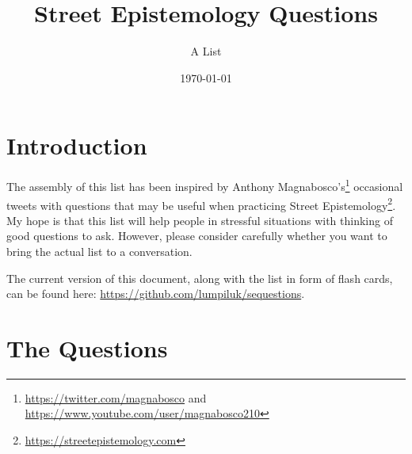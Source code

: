 \documentclass[a4paper]{scrartcl}
\title{Street Epistemology Questions}
\subtitle{A List}
\date{\today}
\begin{document}
    \maketitle
    
    \section*{Introduction}
    
        The assembly of this list has been inspired by Anthony Magnabosco's\footnote{\url{https://twitter.com/magnabosco} and \url{https://www.youtube.com/user/magnabosco210}} occasional tweets with questions that may be useful when practicing Street Epistemology\footnote{\url{https://streetepistemology.com}}. My hope is that this list will help people in stressful situations with thinking of good questions to ask. However, please consider carefully whether you want to bring the actual list to a conversation.
        
        The current version of this document, along with the list in form of flash cards, can be found here: \url{https://github.com/lumpiluk/sequestions}.
    
    \section*{The Questions}
    
\end{document}
